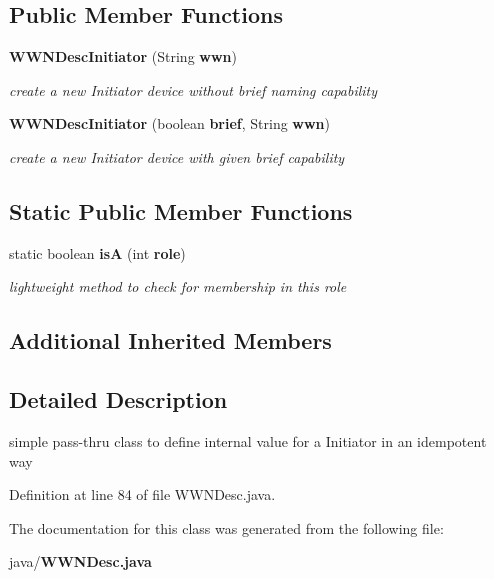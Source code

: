 \subsection*{Public Member Functions}
\begin{DoxyCompactItemize}
\item 
{\bf W\+W\+N\+Desc\+Initiator} (String {\bf wwn})\label{classorg_1_1smallfoot_1_1wwn_1_1WWNDesc_1_1WWNDescInitiator_a64f89dd4a81c8d4d4bad3ab396c53ddb}

\begin{DoxyCompactList}\small\item\em create a new Initiator device without brief naming capability \end{DoxyCompactList}\item 
{\bf W\+W\+N\+Desc\+Initiator} (boolean {\bf brief}, String {\bf wwn})\label{classorg_1_1smallfoot_1_1wwn_1_1WWNDesc_1_1WWNDescInitiator_a7cfdd403295940b5f432280437e4b9f3}

\begin{DoxyCompactList}\small\item\em create a new Initiator device with given brief capability \end{DoxyCompactList}\end{DoxyCompactItemize}
\subsection*{Static Public Member Functions}
\begin{DoxyCompactItemize}
\item 
static boolean {\bf is\+A} (int {\bf role})\label{classorg_1_1smallfoot_1_1wwn_1_1WWNDesc_1_1WWNDescInitiator_a6530bfb83544e64d2c13e7f32784eff2}

\begin{DoxyCompactList}\small\item\em lightweight method to check for membership in this role \end{DoxyCompactList}\end{DoxyCompactItemize}
\subsection*{Additional Inherited Members}


\subsection{Detailed Description}
simple pass-\/thru class to define internal value for a Initiator in an idempotent way 

Definition at line 84 of file W\+W\+N\+Desc.\+java.



The documentation for this class was generated from the following file\+:\begin{DoxyCompactItemize}
\item 
java/{\bf W\+W\+N\+Desc.\+java}\end{DoxyCompactItemize}
